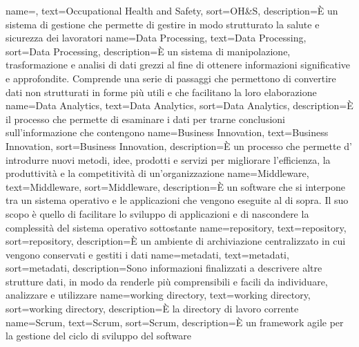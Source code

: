  {
    name=,
    text=Occupational Health and Safety,
    sort=OH\&S,
    description={È un sistema di gestione che permette di gestire in modo strutturato la salute e sicurezza dei lavoratori}
}
{
    name={Data Processing},
    text=Data Processing,
    sort=Data Processing,
    description={È un sistema di manipolazione, trasformazione e analisi di dati grezzi al fine di ottenere informazioni significative e approfondite. Comprende una serie di passaggi che permettono di convertire dati non strutturati in forme più utili e che facilitano la loro elaborazione}
}
{
    name={Data Analytics},
    text=Data Analytics,
    sort=Data Analytics,
    description={È il processo che permette di esaminare i dati per trarne conclusioni sull'informazione che contengono}
}
{
    name={Business Innovation},
    text=Business Innovation,
    sort=Business Innovation,
    description={È un processo che permette d' introdurre nuovi metodi, idee, prodotti e servizi per migliorare l'efficienza, la produttività e la competitività di un'organizzazione}
}
{
    name={Middleware},
    text=Middleware,
    sort=Middleware,
    description={È un software che si interpone tra un sistema operativo e le applicazioni che vengono eseguite al di sopra. Il suo scopo è quello di facilitare lo sviluppo di applicazioni e di nascondere la complessità del sistema operativo sottostante}
}
{
    name={repository},
    text=repository,
    sort=repository,
    description={È un ambiente di archiviazione centralizzato in cui vengono conservati e gestiti i dati}
}
{
    name={metadati},
    text=metadati,
    sort=metadati,
    description={Sono informazioni finalizzati a descrivere altre strutture dati, in modo da renderle più comprensibili e facili da individuare, analizzare e utilizzare}
}
{
    name={working directory},
    text=working directory,
    sort=working directory,
    description={È la directory di lavoro corrente}
}
{
    name={Scrum},
    text=Scrum,
    sort=Scrum,
    description={È un framework agile per la gestione del ciclo di sviluppo del software}
}
